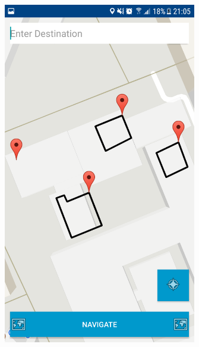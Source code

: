 \documentclass{article}
\begin{document}
	
	\par
	\includegraphics[height=15cm]{navupindoor.png}
\end{document}
